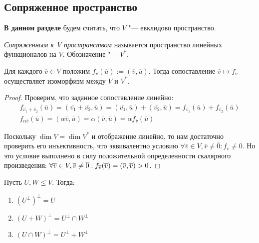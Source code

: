 \subsection{Сопряженное пространство}

\textbf{В данном разделе} будем считать, что $V$ "--- евклидово пространство.

\begin{definition}
	\textit{Сопряженным к V пространством} называется пространство линейных функционалов на $V$. Обозначение "--- $V^*$.
\end{definition}

\begin{theorem}
	Для каждого $\overline{v} \in V$ положим $f_{\overline{v}}(\overline{u}) := (\overline{v}, \overline{u})$. Тогда сопоставление $\overline{v} \mapsto f_{\overline{v}}$ осуществляет изоморфизм между $V$ и $V^*$.
\end{theorem}

\begin{proof}
	Проверим, что заданное сопоставление линейно:
	\begin{gather*}
		f_{\overline{v_1} + \overline{v_2}}(\overline{u}) = (\overline{v_1} + \overline{v_2}, \overline{u}) = (\overline{v_1}, \overline{u}) + (\overline{v_2}, \overline{u}) = f_{\overline{v_1}}(\overline{u}) + f_{\overline{v_2}}(\overline{u})\\
		f_{\alpha\overline{v}}(\overline{u}) = (\alpha\overline{v}, \overline{u}) = \alpha(\overline{v}, \overline{u}) = \alpha f_{\overline{v}}(\overline{u})
	\end{gather*}
	
	Поскольку $\dim{V} = \dim{V^*}$ и отображение линейно, то нам достаточно проверить его инъективность, что эквивалентно условию $\forall \overline{v} \in V, \overline{v} \ne \overline{0}: f_{\overline{v}} \ne 0$. Но это условие выполнено в силу положительной определенности скалярного произведения: $\forall \overline{v} \in V, \overline{v} \ne \overline{0}: f_{\overline{v}}(\overline{v}) \hm= (\overline{v}, \overline{v}) > 0$.
\end{proof}

\begin{corollary}
	Пусть $U, W \le V$. Тогда:
	\begin{enumerate}
		\item $(U^\perp)^\perp = U$
		\item $(U + W)^\perp = U^\perp \cap W^\perp$
		\item $(U \cap W)^\perp = U^\perp + W^\perp$
	\end{enumerate}
\end{corollary}

